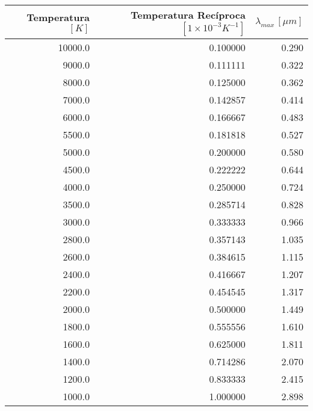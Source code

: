 \begin{tabular}{rrr}
\toprule
 Temperatura $[K]$ &  Temperatura Recíproca $[1 \times 10^{-3}  K^{-1}]$ &  $\lambda_{max}\, [\mu m]$ \\
\midrule
           10000.0 &                                           0.100000 &                      0.290 \\
            9000.0 &                                           0.111111 &                      0.322 \\
            8000.0 &                                           0.125000 &                      0.362 \\
            7000.0 &                                           0.142857 &                      0.414 \\
            6000.0 &                                           0.166667 &                      0.483 \\
            5500.0 &                                           0.181818 &                      0.527 \\
            5000.0 &                                           0.200000 &                      0.580 \\
            4500.0 &                                           0.222222 &                      0.644 \\
            4000.0 &                                           0.250000 &                      0.724 \\
            3500.0 &                                           0.285714 &                      0.828 \\
            3000.0 &                                           0.333333 &                      0.966 \\
            2800.0 &                                           0.357143 &                      1.035 \\
            2600.0 &                                           0.384615 &                      1.115 \\
            2400.0 &                                           0.416667 &                      1.207 \\
            2200.0 &                                           0.454545 &                      1.317 \\
            2000.0 &                                           0.500000 &                      1.449 \\
            1800.0 &                                           0.555556 &                      1.610 \\
            1600.0 &                                           0.625000 &                      1.811 \\
            1400.0 &                                           0.714286 &                      2.070 \\
            1200.0 &                                           0.833333 &                      2.415 \\
            1000.0 &                                           1.000000 &                      2.898 \\
\bottomrule
\end{tabular}
